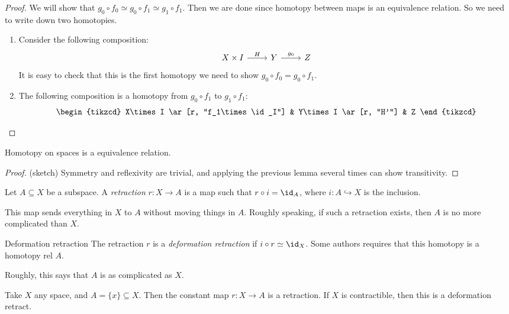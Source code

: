 \documentclass[a4paper]{article}
\begin{document}
\begin{proof}
  We will show that $g_0 \circ f_0 \simeq g_0 \circ f_1 \simeq g_1 \circ f_1$. Then we are done since homotopy between maps is an equivalence relation. So we need to write down two homotopies.

  \begin{enumerate}
    \item Consider the following composition:
      \[
        \begin{tikzcd}
          X\times I \ar[r, "H"] & Y \ar[r, "g_0"] & Z
        \end{tikzcd}
      \]
      It is easy to check that this is the first homotopy we need to show $g_0\circ f_0 = g_0 \circ f_1$.
    \item The following composition is a homotopy from $g_0 \circ f_1$ to $g_1 \circ f_1$:
      \[
        \begin{tikzcd}
          X\times I \ar[r, "f_1\times \id_I"] & Y\times I \ar[r, "H'"] & Z
        \end{tikzcd}
      \]
  \end{enumerate}
\end{proof}

\begin{prop}
  Homotopy on spaces is a equivalence relation.
\end{prop}

\begin{proof}(sketch)
  Symmetry and reflexivity are trivial, and applying the previous lemma several times can show transitivity.
\end{proof}

\begin{defi}[Retraction]
  Let $A\subseteq X$ be a subspace. A \emph{retraction} $r: X\to A$ is a map such that $r\circ i = \id_A$, where $i: A\hookrightarrow X$ is the inclusion.
\end{defi}
This map sends everything in $X$ to $A$ without moving things in $A$. Roughly speaking, if such a retraction exists, then $A$ is no more complicated than $X$.

\begin{defi}{Deformation retraction}
  The retraction $r$ is a \emph{deformation retraction} if $i\circ r \simeq \id_X$. Some authors requires that this homotopy is a homotopy rel $A$.
\end{defi}
Roughly, this says that $A$ is as complicated as $X$.

\begin{eg}
Take $X$ any space, and $A = \{x\}\subseteq X$. Then the constant map $r: X\to A$ is a retraction. If $X$ is contractible, then this is a deformation retract.
\end{eg}
\end{document}
